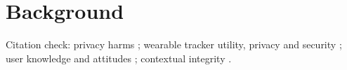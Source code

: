 \section{Background}


Citation check: privacy harms \parencite{citron2021harms}; wearable tracker
utility, privacy and security \parencite{niksirat2024wearable}; user knowledge
and attitudes \parencite{gabriele2020understanding}; contextual integrity
\parencite{nissenbaum2009privacy}.
